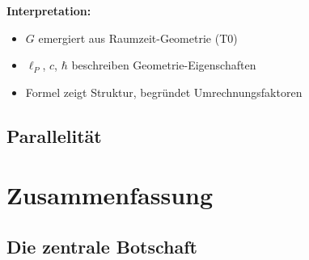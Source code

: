 	\textbf{Interpretation:}
	\begin{itemize}
		\item $G$ emergiert aus Raumzeit-Geometrie (T0)
		\item $\ell_P$, $c$, $\hbar$ beschreiben Geometrie-Eigenschaften
		\item Formel zeigt Struktur, begründet Umrechnungsfaktoren
	\end{itemize}
	
	\subsection{Parallelität}
	
	\begin{table}[h]
		\centering
		\caption{Parallele Strukturen}
	\end{table}
	
	\section{Zusammenfassung}
	
	\subsection{Die zentrale Botschaft}
	
